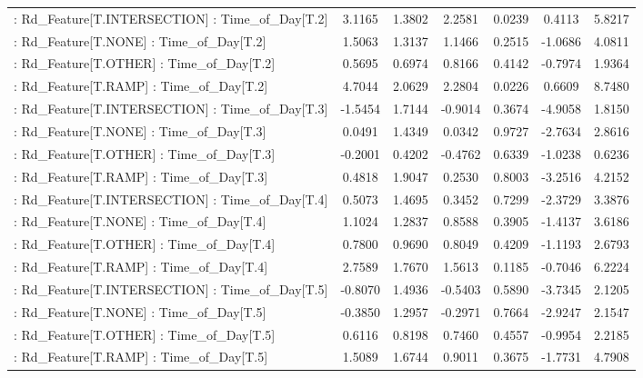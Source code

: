 \begin{longtable}{p{4cm}cccccc}
 : Rd\_Feature[T.INTERSECTION] : Time\_of\_Day[T.2]   &  3.1165 &    1.3802 &  2.2581 &       0.0239 &  0.4113 &  5.8217 \\
 : Rd\_Feature[T.NONE] : Time\_of\_Day[T.2]           &  1.5063 &    1.3137 &  1.1466 &       0.2515 & -1.0686 &  4.0811 \\
 : Rd\_Feature[T.OTHER] : Time\_of\_Day[T.2]          &  0.5695 &    0.6974 &  0.8166 &       0.4142 & -0.7974 &  1.9364 \\
 : Rd\_Feature[T.RAMP] : Time\_of\_Day[T.2]           &  4.7044 &    2.0629 &  2.2804 &       0.0226 &  0.6609 &  8.7480 \\
 : Rd\_Feature[T.INTERSECTION] : Time\_of\_Day[T.3]   & -1.5454 &    1.7144 & -0.9014 &       0.3674 & -4.9058 &  1.8150 \\
 : Rd\_Feature[T.NONE] : Time\_of\_Day[T.3]           &  0.0491 &    1.4349 &  0.0342 &       0.9727 & -2.7634 &  2.8616 \\
 : Rd\_Feature[T.OTHER] : Time\_of\_Day[T.3]          & -0.2001 &    0.4202 & -0.4762 &       0.6339 & -1.0238 &  0.6236 \\
 : Rd\_Feature[T.RAMP] : Time\_of\_Day[T.3]           &  0.4818 &    1.9047 &  0.2530 &       0.8003 & -3.2516 &  4.2152 \\
 : Rd\_Feature[T.INTERSECTION] : Time\_of\_Day[T.4]   &  0.5073 &    1.4695 &  0.3452 &       0.7299 & -2.3729 &  3.3876 \\
 : Rd\_Feature[T.NONE] : Time\_of\_Day[T.4]           &  1.1024 &    1.2837 &  0.8588 &       0.3905 & -1.4137 &  3.6186 \\
 : Rd\_Feature[T.OTHER] : Time\_of\_Day[T.4]          &  0.7800 &    0.9690 &  0.8049 &       0.4209 & -1.1193 &  2.6793 \\
 : Rd\_Feature[T.RAMP] : Time\_of\_Day[T.4]           &  2.7589 &    1.7670 &  1.5613 &       0.1185 & -0.7046 &  6.2224 \\
 : Rd\_Feature[T.INTERSECTION] : Time\_of\_Day[T.5]   & -0.8070 &    1.4936 & -0.5403 &       0.5890 & -3.7345 &  2.1205 \\
 : Rd\_Feature[T.NONE] : Time\_of\_Day[T.5]           & -0.3850 &    1.2957 & -0.2971 &       0.7664 & -2.9247 &  2.1547 \\
 : Rd\_Feature[T.OTHER] : Time\_of\_Day[T.5]          &  0.6116 &    0.8198 &  0.7460 &       0.4557 & -0.9954 &  2.2185 \\
 : Rd\_Feature[T.RAMP] : Time\_of\_Day[T.5]           &  1.5089 &    1.6744 &  0.9011 &       0.3675 & -1.7731 &  4.7908 \\

\end{longtable}

